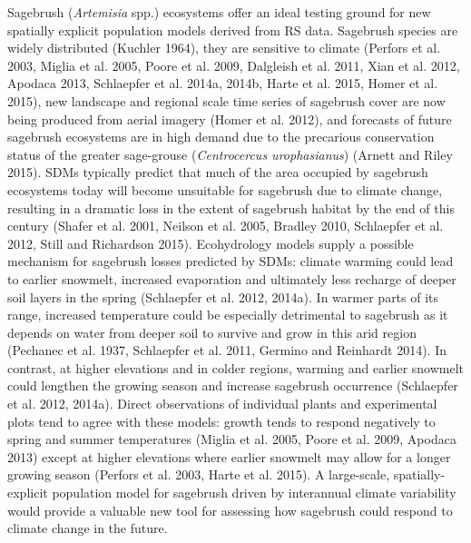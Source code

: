 \documentclass[12pt,]{article}
\begin{document}
Sagebrush (\emph{Artemisia} spp.) ecosystems offer an ideal testing
ground for new spatially explicit population models derived from RS
data. Sagebrush species are widely distributed (Kuchler 1964), they are
sensitive to climate (Perfors et al. 2003, Miglia et al. 2005, Poore et
al. 2009, Dalgleish et al. 2011, Xian et al. 2012, Apodaca 2013,
Schlaepfer et al. 2014a, 2014b, Harte et al. 2015, Homer et al. 2015),
new landscape and regional scale time series of sagebrush cover are now
being produced from aerial imagery (Homer et al. 2012), and forecasts of
future sagebrush ecosystems are in high demand due to the precarious
conservation status of the greater sage-grouse (\emph{Centrocercus
urophasianus}) (Arnett and Riley 2015). SDMs typically predict that much
of the area occupied by sagebrush ecosystems today will become
unsuitable for sagebrush due to climate change, resulting in a dramatic
loss in the extent of sagebrush habitat by the end of this century
(Shafer et al. 2001, Neilson et al. 2005, Bradley 2010, Schlaepfer et
al. 2012, Still and Richardson 2015). Ecohydrology models supply a
possible mechanism for sagebrush losses predicted by SDMs: climate
warming could lead to earlier snowmelt, increased evaporation and
ultimately less recharge of deeper soil layers in the spring (Schlaepfer
et al. 2012, 2014a). In warmer parts of its range, increased temperature
could be especially detrimental to sagebrush as it depends on water from
deeper soil to survive and grow in this arid region (Pechanec et al.
1937, Schlaepfer et al. 2011, Germino and Reinhardt 2014). In contrast,
at higher elevations and in colder regions, warming and earlier snowmelt
could lengthen the growing season and increase sagebrush occurrence
(Schlaepfer et al. 2012, 2014a). Direct observations of individual
plants and experimental plots tend to agree with these models: growth
tends to respond negatively to spring and summer temperatures (Miglia et
al. 2005, Poore et al. 2009, Apodaca 2013) except at higher elevations
where earlier snowmelt may allow for a longer growing season (Perfors et
al. 2003, Harte et al. 2015). A large-scale, spatially-explicit
population model for sagebrush driven by interannual climate variability
would provide a valuable new tool for assessing how sagebrush could
respond to climate change in the future.
\end{document}

